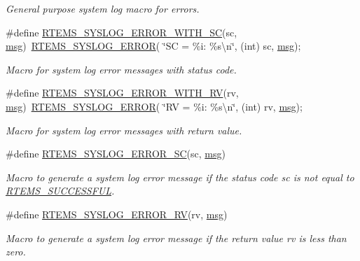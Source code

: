 \begin{DoxyCompactItemize}
\begin{DoxyCompactList}\small\item\em General purpose system log macro for errors. \end{DoxyCompactList}\item 
\mbox{\label{group__rtems__status__checks_ga95798d6db01982fa3a7f25144d88d95b}} 
\#define \mbox{\hyperlink{group__rtems__status__checks_ga95798d6db01982fa3a7f25144d88d95b}{R\+T\+E\+M\+S\+\_\+\+S\+Y\+S\+L\+O\+G\+\_\+\+E\+R\+R\+O\+R\+\_\+\+W\+I\+T\+H\+\_\+\+SC}}(sc,  \mbox{\hyperlink{structmsg}{msg}})~\mbox{\hyperlink{group__rtems__status__checks_ga297efcfefcb8a3bf4dec6585a4884136}{R\+T\+E\+M\+S\+\_\+\+S\+Y\+S\+L\+O\+G\+\_\+\+E\+R\+R\+OR}}( \char`\"{}SC = \%i\+: \%s\textbackslash{}n\char`\"{}, (int) sc, \mbox{\hyperlink{structmsg}{msg}});
\begin{DoxyCompactList}\small\item\em Macro for system log error messages with status code. \end{DoxyCompactList}\item 
\mbox{\label{group__rtems__status__checks_ga1614a89f2a0db9b898741c5f7416d0c7}} 
\#define \mbox{\hyperlink{group__rtems__status__checks_ga1614a89f2a0db9b898741c5f7416d0c7}{R\+T\+E\+M\+S\+\_\+\+S\+Y\+S\+L\+O\+G\+\_\+\+E\+R\+R\+O\+R\+\_\+\+W\+I\+T\+H\+\_\+\+RV}}(rv,  \mbox{\hyperlink{structmsg}{msg}})~\mbox{\hyperlink{group__rtems__status__checks_ga297efcfefcb8a3bf4dec6585a4884136}{R\+T\+E\+M\+S\+\_\+\+S\+Y\+S\+L\+O\+G\+\_\+\+E\+R\+R\+OR}}( \char`\"{}RV = \%i\+: \%s\textbackslash{}n\char`\"{}, (int) rv, \mbox{\hyperlink{structmsg}{msg}});
\begin{DoxyCompactList}\small\item\em Macro for system log error messages with return value. \end{DoxyCompactList}\item 
\#define \mbox{\hyperlink{group__rtems__status__checks_ga7ba7c9299075c60ea065d45dd69bb41c}{R\+T\+E\+M\+S\+\_\+\+S\+Y\+S\+L\+O\+G\+\_\+\+E\+R\+R\+O\+R\+\_\+\+SC}}(sc,  \mbox{\hyperlink{structmsg}{msg}})
\begin{DoxyCompactList}\small\item\em Macro to generate a system log error message if the status code {\itshape sc} is not equal to \mbox{\hyperlink{group__ClassicStatus_gga545d41846817eaba6143d52ee4d9e9fea8a23e2d94778f09399da984d73562536}{R\+T\+E\+M\+S\+\_\+\+S\+U\+C\+C\+E\+S\+S\+F\+UL}}. \end{DoxyCompactList}\item 
\#define \mbox{\hyperlink{group__rtems__status__checks_ga914d6a17fa640c983116dd476b70586d}{R\+T\+E\+M\+S\+\_\+\+S\+Y\+S\+L\+O\+G\+\_\+\+E\+R\+R\+O\+R\+\_\+\+RV}}(rv,  \mbox{\hyperlink{structmsg}{msg}})
\begin{DoxyCompactList}\small\item\em Macro to generate a system log error message if the return value {\itshape rv} is less than zero. \end{DoxyCompactList}\end{DoxyCompactItemize}
